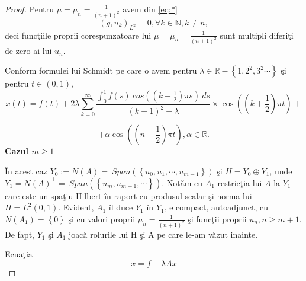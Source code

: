 \documentclass[a4paper,12pt,oneside]{report}
\begin{document}
\begin{proof}
Pentru \(\mu   = \mu _{n} = \frac{1}{\left ( n+1 \right )^{2}}\) avem din \ref{eq:*}
\begin{displaymath}
  \left ( g,u_{k} \right )_{L^{2}} = 0, \forall k\in \mathbb{N}, k\neq n,
\end{displaymath}
deci func\c{t}iile proprii corespunzatoare lui  \(\mu   = \mu _{n} = \frac{1}{\left ( n+1 \right )^{2}}\) sunt multipli diferi\c{t}i de zero ai lui \(u_{n}\).

\noindent Conform formulei lui Schmidt pe care o avem pentru \(\lambda \in \mathbb{R}- \left \{ 1,2^{2},3^{2}\cdots \right \}\) \c{s}i pentru \(t \in \left ( 0,1 \right )\),
\begin{displaymath}
  x\left ( t \right ) = f\left ( t \right ) + 2\lambda\sum_{k=0}^{\infty }\frac{\int_{0}^{1}f\left ( s \right )\ cos\left ( \left ( k+\frac{1}{2} \right )\pi s \right ) \ ds}{\left ( k+1 \right )^{2} -\lambda } \times \cos \left ( \left ( k+\frac{1}{2} \right )\pi t \right ) +
\end{displaymath}
  	      	
\begin{displaymath}
  + \alpha  \cos \left ( \left ( n + \frac{1}{2} \right )\pi t \right ), \alpha \in \mathbb{R}.
\end{displaymath}
\textbf{Cazul \(m\geq 1\)}

\noindent \^{I}n acest caz \(Y_{0} := N\left ( A \right ) = \ Span\left ( \left \{ u_{0},u_{1},\cdots,u_{m-1} \right \} \right )\) \c{s}i \(H = Y_{0} \oplus Y_{1}\), unde  \(Y_{1} = N\left ( A \right )^{\perp } = \ Span \left ( \left \{ u_{m}, u_{m+1},\cdots \right \} \right )\).
Not\u{a}m cu \(A_{1}\) restric\c{t}ia lui \(A\) la \(Y_{1}\) care este un spa\c{t}iu Hilbert \^{i}n raport cu produsul scalar \c{s}i norma lui \(H  = L^{2}\left ( 0,1 \right )\). Evident, \(A_{1}\) \^{i}l duce \(Y_{1}\) \^{i}n \(Y_{1}\), e compact, autoadjunct, cu \(N\left ( A_{1} \right ) = \left \{ 0 \right \}\) \c{s}i cu valori proprii \(\mu _{n} = \frac{1}{\left ( n+1 \right )^{2}}\) \c{s}i func\c{t}ii proprii \(u_{n}, n\geq m+1\). De fapt, \(Y_{1}\) \c{s}i \(A_{1}\) joac\u{a} rolurile lui H \c{s}i A pe care le-am v\u{a}zut inainte.

\noindent Ecua\c{t}ia
\begin{displaymath}
  x = f + \lambda Ax
\end{displaymath}


\end{proof}
\end{document}
